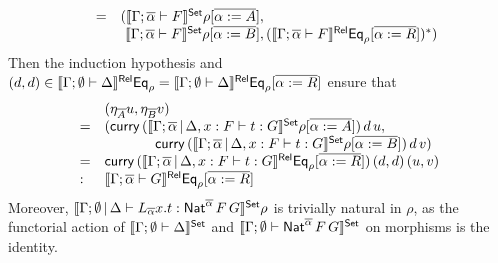 \documentclass{lmcs}
\theoremstyle{plain}\newtheorem{satz}[thm]{Satz}
\begin{document}
{\begin{itemize}
\[\begin{array}{lll}
&  = & (\llbracket{\Gamma;\overline{\alpha} \vdash F}\rrbracket^{\mathsf{Set}}
\rho[\overline{\alpha := A}], \\ 
  & &\,\,\llbracket{\Gamma;\overline{\alpha} \vdash
  F}\rrbracket^{\mathsf{Set}} \rho[\overline{\alpha := B}],
(\llbracket{\Gamma;\overline{\alpha} \vdash F}\rrbracket^{\mathsf{Rel}}
\mathsf{Eq}_{\rho}[\overline{\alpha := R}])^*)
\end{array}\]
Then the induction hypothesis and 
$(d,d) \in \llbracket{\Gamma; \emptyset \vdash \Delta}\rrbracket^{\mathsf{Rel}} \mathsf{Eq}_\rho =
\llbracket{\Gamma; \emptyset \vdash \Delta}\rrbracket^{\mathsf{Rel}} \mathsf{Eq}_\rho[\overline{\alpha := R}]$
ensure that
\[\begin{array}{ll}
& (\eta_{\overline{A}}u,\eta_{\overline{B}}v)\\
= & (\mathsf{curry}\, (\llbracket{\Gamma; \overline{\alpha} \,|\, \Delta, x : F
  \vdash t: G}\rrbracket^{\mathsf{Set}}\rho[\overline{\alpha := A}])\,d\,u, \\
  &\hspace{0.5in} \mathsf{curry}\,
(\llbracket{\Gamma; \overline{\alpha} \,|\, \Delta, x : F \vdash t:
  G}\rrbracket^{\mathsf{Set}}\rho[\overline{\alpha := B}])\,d\,v)\\
= & \mathsf{curry}\, (\llbracket{\Gamma; \overline{\alpha} \,|\, \Delta, x : F
  \vdash t: G}\rrbracket^{\mathsf{Rel}}\mathsf{Eq}_\rho[\overline{\alpha := R}])\,(d,d)\,(u,v)\\
: & \llbracket{\Gamma; \overline{\alpha} \vdash G}\rrbracket^{\mathsf{Rel}}
\mathsf{Eq}_{\rho}[\overline{\alpha := R}]  
\end{array}\]
Moreover,
$\llbracket{\Gamma; \emptyset \,|\, \Delta \vdash L_{\overline{\alpha}} x.t
: \mathsf{Nat}^{\overline{\alpha}} \,F \,G}\rrbracket^{\mathsf{Set}} \rho$
is trivially natural in $\rho$,
as the functorial action of
$\llbracket{\Gamma; \emptyset \vdash \Delta}\rrbracket^{\mathsf{Set}}$
and $\llbracket{\Gamma; \emptyset \vdash \mathsf{Nat}^{\overline{\alpha}} \,F \,G}\rrbracket^{\mathsf{Set}}$
on morphisms is the identity.


\end{itemize}}
\end{document}
